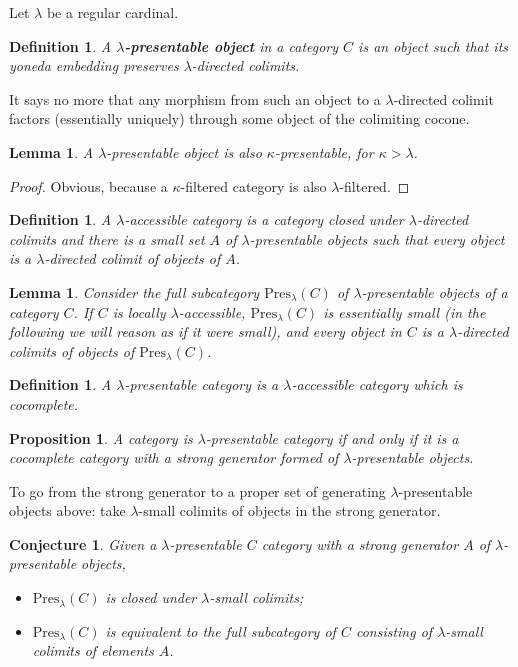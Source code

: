 \documentclass{article}
\newcommand{\Pres}[1]{\text{Pres}_{#1}}
\newtheorem{definition}[theorem]{Definition}
\newtheorem{conjecture}[theorem]{Conjecture}
\newtheorem{proposition}[theorem]{Proposition}
\newtheorem{lemma}[theorem]{Lemma}
\begin{document}
Let $\lambda$ be a regular cardinal.
\begin{definition}
  A \textbf{$\lambda$-presentable object} in a category $C$ is an object such
  that its yoneda embedding preserves $\lambda$-directed colimits.
\end{definition}
It says no more that any morphism from such an object to a $\lambda$-directed
colimit factors (essentially uniquely) through some object of the colimiting cocone.
\begin{lemma}
  A $\lambda$-presentable object is also $\kappa$-presentable, for $\kappa > \lambda$.
\end{lemma}
\begin{proof}
  Obvious, because a $\kappa$-filtered category is also $\lambda$-filtered.
\end{proof}
\begin{definition}
  \label{d:accessible}
  A $\lambda$-accessible category is a category closed
  under $\lambda$-directed colimits and there is a small set $A$ of
  $\lambda$-presentable objects such that every object is a $\lambda$-directed
  colimit of objects of $A$.
\end{definition}
\begin{lemma}
  Consider the full subcategory $\Pres\lambda(C)$ of $\lambda$-presentable
  objects of a category $C$. If $C$ is locally $\lambda$-accessible,
  $\Pres\lambda(C)$ is essentially small (in the following we will reason as if
  it were small), and every object in $C$ is a $\lambda$-directed colimits of objects
  of $\Pres\lambda(C)$.
\end{lemma}
\begin{definition}
  A $\lambda$-presentable category is a $\lambda$-accessible category
  which is cocomplete.
\end{definition}
\begin{proposition}
  \label{d:pres-strong-gen}
  A category is $\lambda$-presentable category if and only if it is a
  cocomplete category with a strong generator formed of $\lambda$-presentable objects.
\end{proposition}
To go from the strong generator to a proper set of generating $\lambda$-presentable objects
above: take $\lambda$-small colimits of objects in the strong generator.
\begin{conjecture}
 Given a $\lambda$-presentable $C$ category with a strong generator $A$ of
 $\lambda$-presentable objects,
 \begin{itemize}
   \item $\Pres\lambda(C)$ is closed under $\lambda$-small colimits;
 \item 
   $\Pres\lambda(C)$ is equivalent to the
   full subcategory of $C$ consisting of $\lambda$-small colimits of elements $A$.
 \end{itemize}
\end{conjecture}
\end{document}
